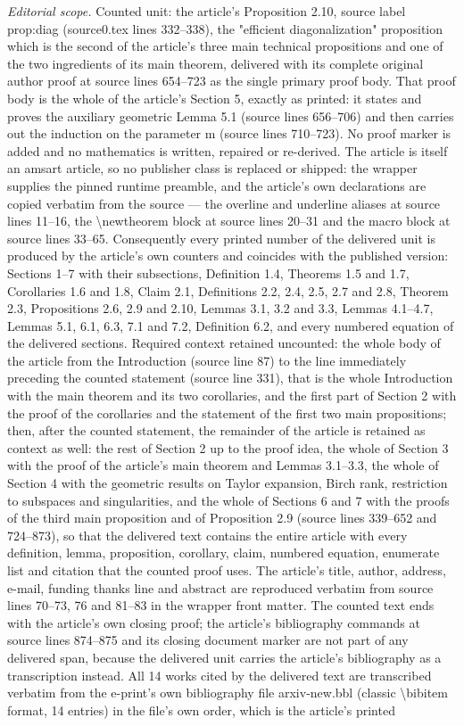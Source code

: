 \documentclass[10pt,a4paper]{amsart}
\theoremstyle{definition}
\begin{document}
\noindent\textit{Editorial scope.} Counted unit: the article's Proposition 2.10, source label prop:diag (source0.tex lines 332--338), the "efficient diagonalization" proposition which is the second of the article's three main technical propositions and one of the two ingredients of its main theorem, delivered with its complete original author proof at source lines 654--723 as the single primary proof body. That proof body is the whole of the article's Section 5, exactly as printed: it states and proves the auxiliary geometric Lemma 5.1 (source lines 656--706) and then carries out the induction on the parameter m (source lines 710--723). No proof marker is added and no mathematics is written, repaired or re-derived. The article is itself an amsart article, so no publisher class is replaced or shipped: the wrapper supplies the pinned runtime preamble, and the article's own declarations are copied verbatim from the source --- the overline and underline aliases at source lines 11--16, the \textbackslash{}newtheorem block at source lines 20--31 and the macro block at source lines 33--65. Consequently every printed number of the delivered unit is produced by the article's own counters and coincides with the published version: Sections 1--7 with their subsections, Definition 1.4, Theorems 1.5 and 1.7, Corollaries 1.6 and 1.8, Claim 2.1, Definitions 2.2, 2.4, 2.5, 2.7 and 2.8, Theorem 2.3, Propositions 2.6, 2.9 and 2.10, Lemmas 3.1, 3.2 and 3.3, Lemmas 4.1--4.7, Lemmas 5.1, 6.1, 6.3, 7.1 and 7.2, Definition 6.2, and every numbered equation of the delivered sections. Required context retained uncounted: the whole body of the article from the Introduction (source line 87) to the line immediately preceding the counted statement (source line 331), that is the whole Introduction with the main theorem and its two corollaries, and the first part of Section 2 with the proof of the corollaries and the statement of the first two main propositions; then, after the counted statement, the remainder of the article is retained as context as well: the rest of Section 2 up to the proof idea, the whole of Section 3 with the proof of the article's main theorem and Lemmas 3.1--3.3, the whole of Section 4 with the geometric results on Taylor expansion, Birch rank, restriction to subspaces and singularities, and the whole of Sections 6 and 7 with the proofs of the third main proposition and of Proposition 2.9 (source lines 339--652 and 724--873), so that the delivered text contains the entire article with every definition, lemma, proposition, corollary, claim, numbered equation, enumerate list and citation that the counted proof uses. The article's title, author, address, e-mail, funding thanks line and abstract are reproduced verbatim from source lines 70--73, 76 and 81--83 in the wrapper front matter. The counted text ends with the article's own closing proof; the article's bibliography commands at source lines 874--875 and its closing document marker are not part of any delivered span, because the delivered unit carries the article's bibliography as a transcription instead. All 14 works cited by the delivered text are transcribed verbatim from the e-print's own bibliography file arxiv-new.bbl (classic \textbackslash{}bibitem format, 14 entries) in the file's own order, which is the article's printed 
\end{document}
